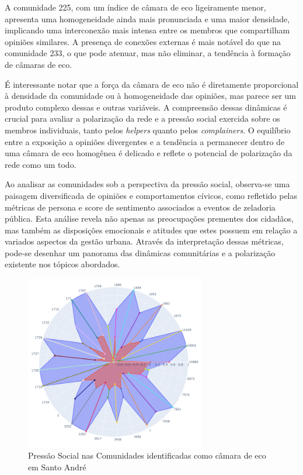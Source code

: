 A comunidade 225, com um índice de câmara de eco ligeiramente menor, apresenta uma homogeneidade ainda mais pronunciada e uma maior densidade, implicando uma interconexão mais intensa entre os membros que compartilham opiniões similares. A presença de conexões externas é mais notável do que na comunidade 233, o que pode atenuar, mas não eliminar, a tendência à formação de câmaras de eco.

É interessante notar que a força da câmara de eco não é diretamente proporcional à densidade da comunidade ou à homogeneidade das opiniões, mas parece ser um produto complexo dessas e outras variáveis. A compreensão dessas dinâmicas é crucial para avaliar a polarização da rede e a pressão social exercida sobre os membros individuais, tanto pelos \textit{helpers} quanto pelos \textit{complainers}. O equilíbrio entre a exposição a opiniões divergentes e a tendência a permanecer dentro de uma câmara de eco homogênea é delicado e reflete o potencial de polarização da rede como um todo.

Ao analisar as comunidades sob a perspectiva da pressão social, observa-se uma paisagem diversificada de opiniões e comportamentos cívicos, como refletido pelas métricas de persona e score de sentimento associados a eventos de zeladoria pública. Esta análise revela não apenas as preocupações prementes dos cidadãos, mas também as disposições emocionais e atitudes que estes possuem em relação a variados aspectos da gestão urbana. Através da interpretação dessas métricas, pode-se desenhar um panorama das dinâmicas comunitárias e a polarização existente nos tópicos abordados.

\begin{figure}[htb]
	\centering
	\includegraphics[width=0.7\textwidth]{images/echo_chambers_santo_andre_social_pressure.png}
	\caption{Pressão Social nas Comunidades identificadas como câmara de eco em Santo André}
	\label{fig:echo_chambers_santo_andre_social_pressure}
\end{figure}

